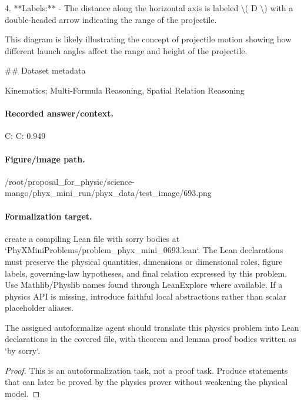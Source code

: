 4. **Labels:**
   - The distance along the horizontal axis is labeled \textbackslash{}( D \textbackslash{}) with a double-headed arrow indicating the range of the projectile.

This diagram is likely illustrating the concept of projectile motion showing how different launch angles affect the range and height of the projectile.

\#\# Dataset metadata

Kinematics; Multi-Formula Reasoning, Spatial Relation Reasoning

\paragraph{Recorded answer/context.}
C: C: 0.949

\paragraph{Figure/image path.}
/root/proposal\_for\_physic/science-mango/phyx\_mini\_run/phyx\_data/test\_image/693.png

\paragraph{Formalization target.}
create a compiling Lean file with sorry bodies at `PhyXMiniProblems/problem\_phyx\_mini\_0693.lean`. The Lean declarations must preserve the physical quantities, dimensions or dimensional roles, figure labels, governing-law hypotheses, and final relation expressed by this problem.
Use Mathlib/Physlib names found through LeanExplore where available. If a physics API is missing, introduce faithful local abstractions rather than scalar placeholder aliases.

\begin{theorem}
\label{thm:physics:phyx_mini_0693:target}
The assigned autoformalize agent should translate this physics problem into Lean declarations in the covered file, with theorem and lemma proof bodies written as `by sorry`.
\end{theorem}
\begin{proof}
This is an autoformalization task, not a proof task. Produce statements that can later be proved by the physics prover without weakening the physical model.
\end{proof}


